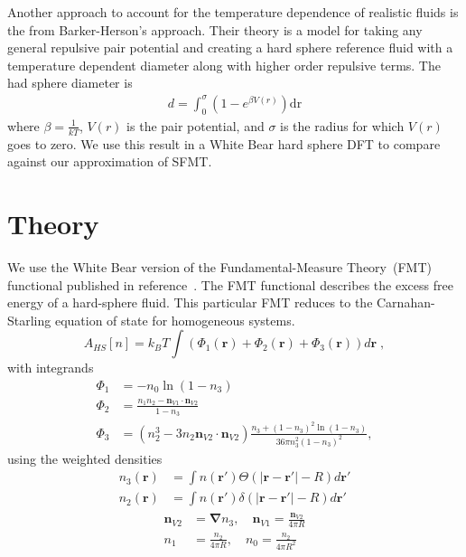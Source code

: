 \documentclass[letterpaper,twocolumn,amsmath,amssymb,prb]{revtex4-1}
\newcommand{\rr}{\textbf{r}}
\begin{document}
Another approach to account for the temperature dependence of
realistic fluids is the from Barker-Herson's
approach\cite{barker1967perturbation}. Their theory is a model for
taking any general repulsive pair potential and creating a hard sphere
reference fluid with a temperature dependent diameter along with
higher order repulsive terms. The had sphere diameter is
\begin{align}
  d = \int_0^\sigma\left( 1 - e^{\beta V(r)} \right)\mathrm{dr}
\end{align} 
where $\beta = \frac{1}{kT}$, $V(r)$ is the pair potential, and $\sigma$
is the radius for which $V(r)$ goes to zero. We use this result in a White
Bear hard sphere DFT to compare against our approximation of SFMT.


\section{Theory}

We use the White Bear version of the Fundamental-Measure Theory~(FMT)
functional published in reference~\cite{roth2002whitebear}.  The FMT
functional describes the excess free energy of a hard-sphere fluid.
This particular FMT reduces to the Carnahan-Starling equation of state
for homogeneous systems.
\begin{equation}
A_\textit{HS}[n] = k_B T \int \left(\Phi_1(\rr) + \Phi_2(\rr) + \Phi_3(\rr)\right) d\rr \; ,
\end{equation}
with integrands
\begin{align}
\Phi_1 &= -n_0 \ln\left( 1 - n_3\right)\\
\Phi_2 &= \frac{n_1 n_2 - \mathbf{n}_{V1} \cdot\mathbf{n}_{V2}}{1-n_3} \\
\Phi_3 &= (n_2^3 - 3 n_2 \mathbf{n}_{V2} \cdot \mathbf{n}_{V2}) \frac{
  n_3 + (1-n_3)^2 \ln(1-n_3)
}{
  36\pi n_3^2\left( 1 - n_3 \right)^2
} ,
\end{align}
using the weighted densities
\begin{align}
  n_3(\rr) &= \int n(\rr') \Theta(\left|\rr - \rr'\right| - R) d\rr' \\
  n_2(\rr) &= \int n(\rr') \delta(\left|\rr - \rr'\right| - R) d\rr'
\end{align}
\begin{align}
  \mathbf{n}_{V2} &= \mathbf{\nabla} n_3 , \quad
  \mathbf{n}_{V1} = \frac{\mathbf{n}_{V2}}{4\pi R} \\
  n_1 &= \frac{n_2}{4\pi R} , \quad
  n_0 = \frac{n_2}{4\pi R^2}
\end{align}
\end{document}
